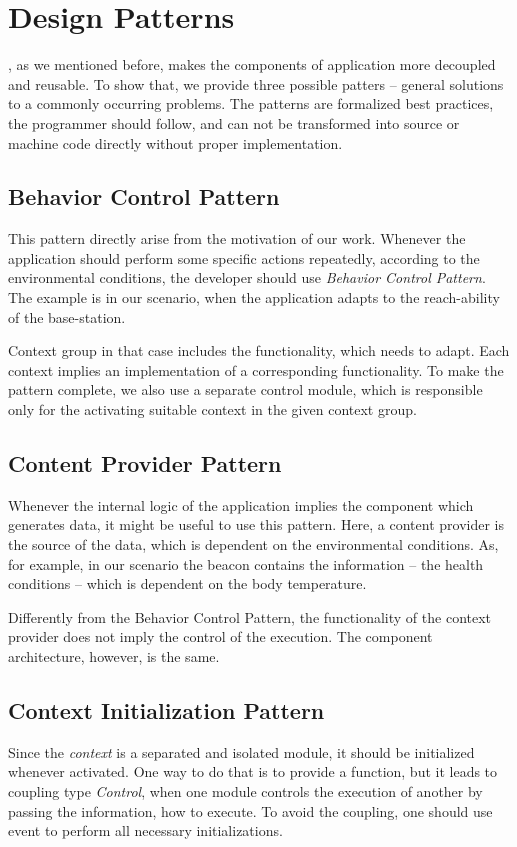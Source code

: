\section{Design Patterns}

\conesc, as we mentioned before, makes the components of application more
decoupled and reusable. To show that, we provide three possible patters --
general solutions to a commonly occurring problems. The patterns are formalized
best practices, the programmer should follow, and can not be transformed into
source or machine code directly without proper implementation.

\subsection{Behavior Control Pattern}

This pattern directly arise from the motivation of our work. Whenever the
application should perform some specific actions repeatedly, according to the
environmental conditions, the developer should use \emph{Behavior Control
Pattern}. The example is in our scenario, when the application adapts to the
reach-ability of the base-station.

Context group in that case includes the functionality, which needs to adapt.
Each context implies an implementation of a corresponding functionality. To make
the pattern complete, we also use a separate control module, which is
responsible only for the activating suitable context in the given context group.

\subsection{Content Provider Pattern}

Whenever the internal logic of the application implies the component which
generates data, it might be useful to use this pattern. Here, a content provider
is the source of the data, which is dependent on the environmental conditions.
As, for example, in our scenario the beacon contains the information -- the
health conditions -- which is dependent on the body temperature.

Differently from the Behavior Control Pattern, the functionality of the context
provider does not imply the control of the execution. The component
architecture, however, is the same.

\subsection{Context Initialization Pattern}

Since the \emph{context} is a separated and isolated module, it should be
initialized whenever activated. One way to do that is to provide a  function, but it leads to coupling type \emph{Control}, when one module
controls the execution of another by passing the information, how to execute. To
avoid the coupling, one should use event  to perform all
necessary initializations.

